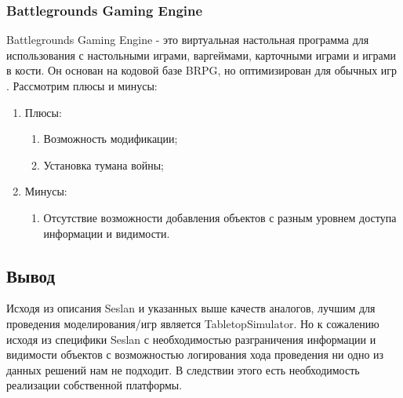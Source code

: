 	\subsubsection{Battlegrounds Gaming Engine}
	
	Battlegrounds Gaming Engine - это виртуальная настольная программа для использования с настольными играми, варгеймами, карточными играми и играми в кости. Он основан на кодовой базе BRPG, но оптимизирован для обычных игр \cite{5}. Рассмотрим плюсы и минусы:
	
	\begin{enumerate}
		\item Плюсы:
		\begin{enumerate}
			\item Возможность модификации;
			\item Установка тумана войны;
		\end{enumerate}
		\item Минусы:
		\begin{enumerate}
			\item Отсутствие возможности добавления объектов с разным уровнем доступа информации и видимости.
		\end{enumerate}
	\end{enumerate}
	
\subsection{Вывод}

	Исходя из описания Seslan и указанных выше качеств аналогов, лучшим для проведения моделирования/игр является TabletopSimulator. Но к сожалению исходя из специфики Seslan с необходимостью разграничения информации и видимости объектов с возможностью логирования хода проведения ни одно из данных решений нам не подходит. 
	В следствии этого есть необходимость реализации собственной платформы.
